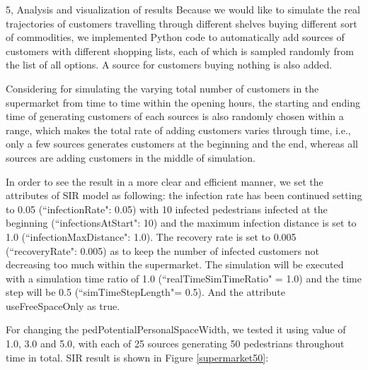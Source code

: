\documentclass[10pt,a4paper]{article}
\begin{document}
\begin{task}{5, Analysis and visualization of results}
Because we would like to simulate the real trajectories of customers travelling through different shelves buying different sort of commodities, we implemented Python code to automatically add sources of customers with different shopping lists, each of which is sampled randomly from the list of all options. A source for customers buying nothing is also added. 

Considering for simulating the varying total number of customers in the supermarket from time to time within the opening hours, the starting and ending time of generating customers of each sources is also randomly chosen within a range, which makes the total rate of adding customers varies through time, i.e., only a few sources generates customers at the beginning and the end, whereas all sources are adding customers in the middle of simulation.

In order to see the result in a more clear and efficient manner, we set the attributes of SIR model as following: the infection rate has been continued setting to 0.05 (``infectionRate": 0.05) with 10 infected pedestrians infected at the beginning (``infectionsAtStart": 10) and the maximum infection distance is set to 1.0 (``infectionMaxDistance": 1.0). The recovery rate is set to 0.005 (``recoveryRate": 0.005) as to keep the number of infected customers not decreasing too much within the supermarket. The simulation will be executed with a simulation time ratio of 1.0 (``realTimeSimTimeRatio" = 1.0) and the time step will be 0.5 (``simTimeStepLength"= 0.5). And the attribute useFreeSpaceOnly as true.

For changing the pedPotentialPersonalSpaceWidth, we tested it using value of 1.0, 3.0 and 5.0, with each of 25 sources generating 50 pedestrians throughout time in total. SIR result is shown in Figure \ref{supermarket50}:


\end{task}
\end{document}
